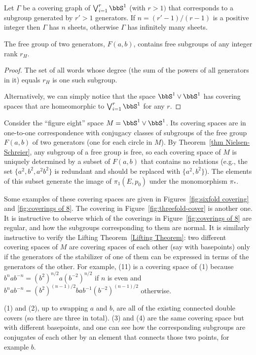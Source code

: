 \begin{cor}
    Let $\varGamma$ be a covering graph of $\bigvee_{i=1}^r \bbS^1$ (with $r>1)$ that corresponds to a subgroup generated by $r'>1$ generators. If $n=(r'-1)/(r-1)$ is a positive integer then $\varGamma$ has $n$ sheets, otherwise $\varGamma$ has infinitely many sheets.
\end{cor}
\begin{cor}
    The free group of two generators, $F(a,b)$, contains free subgroups of any integer rank $r_H$. 
\end{cor}
\begin{proof}
    The set of all words whose degree (the sum of the powers of all generators in it) equals $r_H$ is one such subgroup.

    Alternatively, we can simply notice that the space $\bbS^1\vee \bbS^1$ has covering spaces that are homeomorphic to $\bigvee_{i=1}^r \bbS^1$ for any $r$.
\end{proof}

\begin{example}
    Consider the ``figure eight'' space $M=\bbS^1\vee \bbS^1$. Its covering spaces are in one-to-one correspondence with conjugacy classes of subgroups of the free group $F(a,b)$ of two generators (one for each circle in $M$). By Theorem~\ref{thm Nielsen-Schreier}, any subgroup of a free group is free, so each covering space of $M$ is uniquely determined by a subset of $F(a,b)$ that contains no relations (e.g., the set $\{a^2,b^2,a^2b^2\}$ is redundant and should be replaced with $\{a^2,b^2\}$). The elements of this subset generate the image of $\pi_1(E,p_0)$ under the monomorphism $\pi_\ast$.

    Some examples of these covering spaces are given in Figures~\ref{fig:sixfold covering} and \ref{fig:coverings of 8}. The covering in Figure~\ref{fig:threefold-cover} is another one. It is instructive to observe which of the coverings in Figure~\ref{fig:coverings of 8} are regular, and how the subgroups corresponding to them are normal. It is similarly instructive to verify the Lifting Theorem~\ref{Lifting Theorem}: two different covering spaces of $M$ are covering spaces of each other (say with basepoints) only if the generators of the stabilizer of one of them can be expressed in terms of the generators of the other. For example, (11) is a covering space of (1) because  $b^nab^{-n}=(b^2)^{n/2}a(b^{-2})^{n/2}$ if $n$ is even and $b^nab^{-n}=(b^2)^{(n-1)/2}bab^{-1}(b^{-2})^{(n-1)/2}$ otherwise.

    (1) and (2), up to swapping $a$ and $b$, are all of the existing connected double covers (so there are three in total). (3) and (4) are the same covering space but with different basepoints, and one can see how the corresponding subgroups are conjugates of each other by an element that connects those two points, for example $b$.
\end{example}

